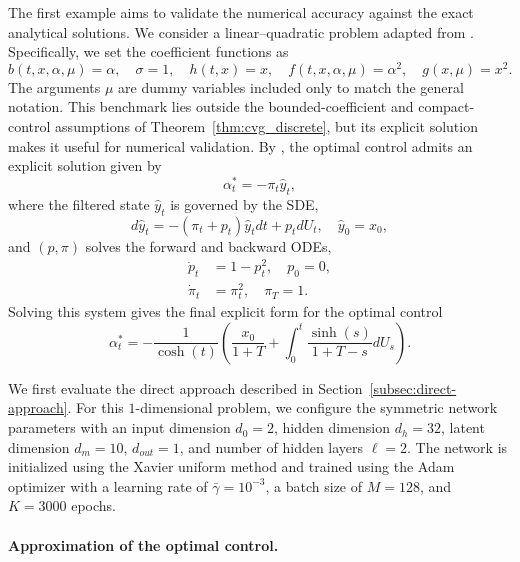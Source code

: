 \documentclass[11pt]{article}
\numberwithin{equation}{section}
\theoremstyle{plain}
\theoremstyle{definition}
\theoremstyle{remark}
\begin{document}
	The first example aims to validate the numerical accuracy against the exact analytical solutions. We consider a linear--quadratic problem adapted from \cite{li2024discrete}. Specifically, we set the coefficient functions as 
		\begin{equation*}
			b(t,x,\alpha,\mu) = \alpha, \quad \sigma = 1, \quad h(t,x) = x, \quad f(t,x,\alpha,\mu) = \alpha^2, \quad g(x,\mu) = x^2.
		\end{equation*}
		The arguments $\mu$ are dummy variables included only to match the general notation. This benchmark lies outside the bounded-coefficient and compact-control assumptions of Theorem~\ref{thm:cvg_discrete}, but its explicit solution makes it useful for numerical validation.
		By \cite[Theorem 2.4.1]{bensoussan1992stochastic}, the optimal control admits an explicit solution given by 
	\begin{equation*}
		\alpha_t^* = -\pi_t \hat{y}_t,
	\end{equation*}
	where the filtered state $\hat{y}_t$ is governed by the SDE,  
	\begin{equation*}
		d \hat{y}_t = -(\pi_t + p_t)\hat{y}_t dt + p_t dU_t, \quad \hat{y}_0 = x_0, 
	\end{equation*}
	and $(p, \pi)$ solves the forward and backward ODEs, 
	\begin{equation*}
		\begin{aligned}
			\dot{p}_t &= 1- p_t^2, \quad p_0 = 0, \\
			\dot{\pi}_t &= \pi_t^2, \quad \pi_T = 1. 
		\end{aligned}
	\end{equation*}
	Solving this system gives the final explicit form for the optimal control 
	\begin{equation} \label{eq:lq1-explicit-optimal-control}
		\alpha_t^* = -\frac{1}{\cosh(t)}\left( \frac{x_0}{1+T} + \int_0^t \frac{\sinh(s)}{1+T-s} dU_s\right).
	\end{equation}
	
	We first evaluate the direct approach described in Section~\ref{subsec:direct-approach}. For this $1$-dimensional problem, we configure the symmetric network parameters with an input dimension $d_0=2$, hidden dimension $d_h=32$, latent dimension $d_m=10$, $d_{out}=1$, and number of hidden layers $\ell=2$. The network is initialized using the Xavier uniform method and trained using the Adam optimizer with a learning rate of $\bar{\gamma} = 10^{-3}$, a batch size of $M=128$, and $K=3000$ epochs. 
	
	\paragraph{Approximation of the optimal control.}
	
\end{document}
